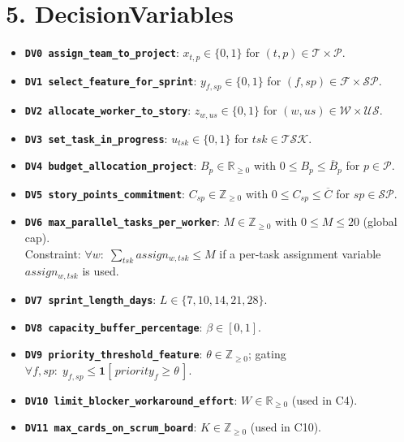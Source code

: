 \documentclass[11pt,a4paper]{article}
\begin{document}
\section{5. DecisionVariables}
\begin{itemize}[leftmargin=2em]
  \item \textbf{\texttt{DV0 assign\_team\_to\_project}}: $x_{t,p}\in\{0,1\}$ for $(t,p)\in\mathcal{T}\times\mathcal{P}$.
  \item \textbf{\texttt{DV1 select\_feature\_for\_sprint}}: $y_{f,sp}\in\{0,1\}$ for $(f,sp)\in\mathcal{F}\times\mathcal{SP}$.
  \item \textbf{\texttt{DV2 allocate\_worker\_to\_story}}: $z_{w,us}\in\{0,1\}$ for $(w,us)\in\mathcal{W}\times\mathcal{US}$.
  \item \textbf{\texttt{DV3 set\_task\_in\_progress}}: $u_{tsk}\in\{0,1\}$ for $tsk\in\mathcal{TSK}$.
  \item \textbf{\texttt{DV4 budget\_allocation\_project}}: $B_p\in\mathbb{R}_{\ge 0}$ with $0\le B_p\le \overline{B}_p$ for $p\in\mathcal{P}$.
  \item \textbf{\texttt{DV5 story\_points\_commitment}}: $C_{sp}\in\mathbb{Z}_{\ge 0}$ with $0\le C_{sp}\le \overline{C}$ for $sp\in\mathcal{SP}$.
  \item \textbf{\texttt{DV6 max\_parallel\_tasks\_per\_worker}}: $M\in\mathbb{Z}_{\ge 0}$ with $0\le M\le 20$ (global cap). \\
        Constraint: $\forall w:\; \sum_{tsk} assign_{w,tsk} \le M$ if a per-task assignment variable $assign_{w,tsk}$ is used.
  \item \textbf{\texttt{DV7 sprint\_length\_days}}: $L\in\{7,10,14,21,28\}$.
  \item \textbf{\texttt{DV8 capacity\_buffer\_percentage}}: $\beta\in[0,1]$.
  \item \textbf{\texttt{DV9 priority\_threshold\_feature}}: $\theta\in\mathbb{Z}_{\ge 0}$; gating $\forall f,sp:\; y_{f,sp}\le \mathbf{1}[\,priority_f\ge\theta\,]$.
  \item \textbf{\texttt{DV10 limit\_blocker\_workaround\_effort}}: $W\in\mathbb{R}_{\ge 0}$ (used in C4).
  \item \textbf{\texttt{DV11 max\_cards\_on\_scrum\_board}}: $K\in\mathbb{Z}_{\ge 0}$ (used in C10).
\end{itemize}
\end{document}
